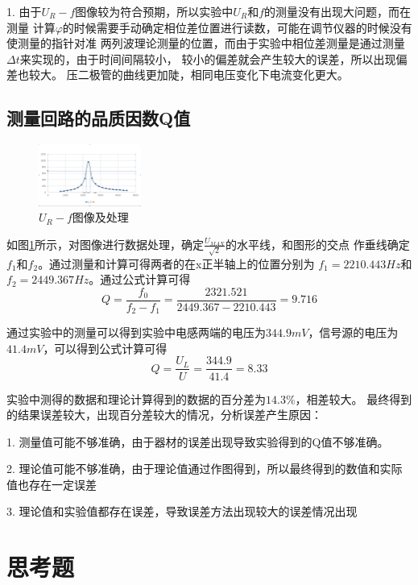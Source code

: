 \documentclass{ctexart}
\begin{document}
  1. 由于$U_{R}-f$图像较为符合预期，所以实验中$U_{R}\mbox{和}f$的测量没有出现大问题，而在测量
    计算$\varphi$的时候需要手动确定相位差位置进行读数，可能在调节仪器的时候没有使测量的指针对准
    两列波理论测量的位置，而由于实验中相位差测量是通过测量$\Delta t$来实现的，由于时间间隔较小，
    较小的偏差就会产生较大的误差，所以出现偏差也较大。
压二极管的曲线更加陡，相同电压变化下电流变化更大。

  \subsection{测量回路的品质因数Q值}
  \begin{figure}\label{urf}
    \centering
    \includegraphics[width=0.3\textwidth,height=0.3\textheight]{f_ur_zuotu.png}
    \caption{$U_{R}-f$图像及处理}
  \end{figure}

  如图\ref{urf}所示，对图像进行数据处理，确定$\frac{U_{MAX}}{\sqrt{2}}$的水平线，和图形的交点
  作垂线确定$f_{1}\mbox{和}f_{2}$。通过测量和计算可得两者的在x正半轴上的位置分别为
  $f_{1}=2210.443Hz$和$f_{2}=2449.367Hz$。通过公式计算可得
  \begin{equation}
    Q=\frac{f_{0}}{f_{2}-f_{1}}=\frac{2321.521}{2449.367-2210.443}=9.716
  \end{equation}

  通过实验中的测量可以得到实验中电感两端的电压为$344.9mV$，信号源的电压为$41.4mV$，可以得到公式计算可得
  \begin{equation}
    Q=\frac{U_{L}}{U}=\frac{344.9}{41.4}=8.33
  \end{equation}

  实验中测得的数据和理论计算得到的数据的百分差为$14.3\%$，相差较大。
  最终得到的结果误差较大，出现百分差较大的情况，分析误差产生原因：

  1.  测量值可能不够准确，由于器材的误差出现导致实验得到的Q值不够准确。

  2.  理论值可能不够准确，由于理论值通过作图得到，所以最终得到的数值和实际值也存在一定误差

  3.  理论值和实验值都存在误差，导致误差方法出现较大的误差情况出现

\section{思考题}
\end{document}
